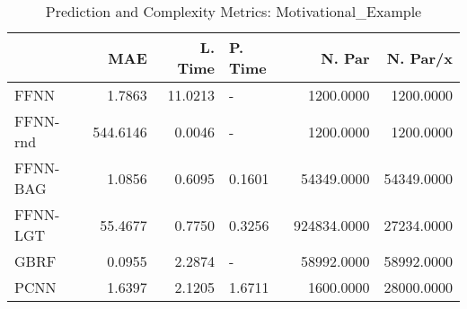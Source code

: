 \begin{table}
\centering
\caption{Prediction and Complexity Metrics: Motivational_Example}
\label{tab__Motivational_Example__Fix_Neurons_QTrue}
\begin{tabular}{lrrlrr}
\toprule
{} &      MAE &  L. Time & P. Time &      N. Par &   N. Par/x \\
\midrule
FFNN     &   1.7863 &  11.0213 &       - &   1200.0000 &  1200.0000 \\
FFNN-rnd & 544.6146 &   0.0046 &       - &   1200.0000 &  1200.0000 \\
FFNN-BAG &   1.0856 &   0.6095 &  0.1601 &  54349.0000 & 54349.0000 \\
FFNN-LGT &  55.4677 &   0.7750 &  0.3256 & 924834.0000 & 27234.0000 \\
GBRF     &   0.0955 &   2.2874 &       - &  58992.0000 & 58992.0000 \\
PCNN     &   1.6397 &   2.1205 &  1.6711 &   1600.0000 & 28000.0000 \\
\bottomrule
\end{tabular}
\end{table}
